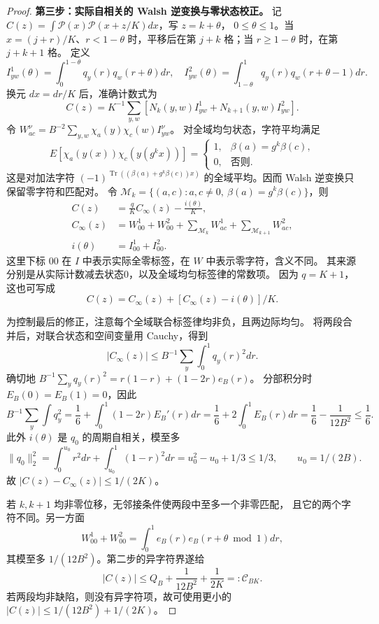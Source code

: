 \documentclass[UTF8,a4paper,11pt,fontset=fandol]{ctexart}
\theoremstyle{remark}
\begin{document}
\begin{proof}
\textbf{第三步：实际自相关的 Walsh 逆变换与零状态校正。}
记 $C(z)=\int\mathcal P(x)\mathcal P(x+z/K)dx$，写 $z=k+\theta$，
$0\le\theta\le1$。当 $x=(j+r)/K$、$r<1-\theta$ 时，平移后在第
$j+k$ 格；当 $r\ge1-\theta$ 时，在第 $j+k+1$ 格。
定义
\[
 I^1_{yw}(\theta)=\int_0^{1-\theta}q_y(r)q_w(r+\theta)dr,
 \quad I^2_{yw}(\theta)=\int_{1-\theta}^1q_y(r)q_w(r+\theta-1)dr.
\]
换元 $dx=dr/K$ 后，准确计数式为
\[
 C(z)=K^{-1}\sum_{y,w}[N_k(y,w)I^1_{yw}+N_{k+1}(y,w)I^2_{yw}].
\]
令 $W^\nu_{ac}=B^{-2}\sum_{y,w}\chi_a(y)\chi_c(w)I^\nu_{yw}$。
对全域均匀状态，字符平均满足
\[
 E[\chi_a(y(x))\chi_c(y(g^kx))]
 =\begin{cases}1,&\beta(a)=g^k\beta(c),\\0,&\text{否则}.
 \end{cases}
\]
这是对加法字符 $(-1)^{\operatorname{Tr}((\beta(a)+g^k\beta(c))x)}$
的全域平均。因而 Walsh 逆变换只保留零字符和匹配对。
令 $\mathcal M_k=\{(a,c):a,c\ne0,\ \beta(a)=g^k\beta(c)\}$，则
\begin{align*}
 C(z)&=\frac qK C_\infty(z)-\frac{i(\theta)}K,\\
 C_\infty(z)&=W^1_{00}+W^2_{00}
 +\sum_{\mathcal M_k}W^1_{ac}+\sum_{\mathcal M_{k+1}}W^2_{ac},\\
 i(\theta)&=I^1_{00}+I^2_{00}.
\end{align*}
这里下标 $00$ 在 $I$ 中表示实际全零标签，在 $W$ 中表示零字符，含义不同。
其来源分别是从实际计数减去状态0，以及全域均匀标签律的常数项。
因为 $q=K+1$，这也可写成
\[
 C(z)=C_\infty(z)+[C_\infty(z)-i(\theta)]/K.
\]

为控制最后的修正，注意每个全域联合标签律均非负，且两边际均匀。
将两段合并后，对联合状态和空间变量用 Cauchy，得到
\[
 |C_\infty(z)|\le B^{-1}\sum_y\int_0^1q_y(r)^2dr.
\]
确切地 $B^{-1}\sum_yq_y(r)^2=r(1-r)+(1-2r)e_B(r)$。
分部积分时 $E_B(0)=E_B(1)=0$，因此
\[
 B^{-1}\sum_y\int q_y^2
 =\frac16+\int_0^1(1-2r)E_B'(r)dr
 =\frac16+2\int_0^1E_B(r)dr
 =\frac16-\frac1{12B^2}\le\frac16.
\]
此外 $i(\theta)$ 是 $q_0$ 的周期自相关，模至多
\[
 \|q_0\|_2^2=\int_0^{u_0}r^2dr+\int_{u_0}^1(1-r)^2dr
 =u_0^2-u_0+1/3\le1/3,\qquad u_0=1/(2B).
\]
故 $|C(z)-C_\infty(z)|\le1/(2K)$。

若 $k,k+1$ 均非零位移，无邻接条件使两段中至多一个非零匹配，
且它的两个字符不同。另一方面
\[
 W^1_{00}+W^2_{00}=\int_0^1e_B(r)e_B(r+\theta\bmod1)dr,
\]
其模至多 $1/(12B^2)$。第二步的异字符界遂给
\begin{equation}\label{eq:paperfarC}
 |C(z)|\le Q_B+\frac1{12B^2}+\frac1{2K}=:\mathcal C_{BK}.
\end{equation}
若两段均非缺陷，则没有异字符项，故可使用更小的
$|C(z)|\le1/(12B^2)+1/(2K)$。


\end{proof}
\end{document}
